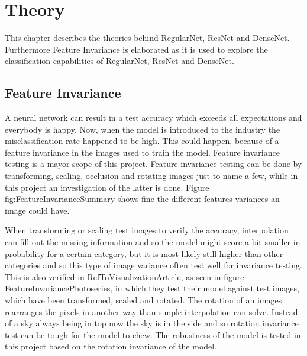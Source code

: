 \chapter{Theory}
\label{chp:theory}

This chapter describes the theories behind RegularNet, ResNet and DenseNet. Furthermore Feature Invariance is elaborated as it is used to explore the classification capabilities of RegularNet, ResNet and DenseNet.

\section{Feature Invariance}
A neural network can result in a test accuracy which exceeds all expectations and everybody is happy. Now, when the model is introduced to the industry the misclassification rate happened to be high. This could happen, because of a feature invariance in the images used to train the model. Feature invariance testing is a mayor scope of this project. Feature invariance testing can be done by transforming, scaling, occlusion and rotating images just to name a few, while in this project an investigation of the latter is done. Figure fig:FeatureInvarianceSummary shows fine the different features variances an image could have.

\FloatBarrier

When transforming or scaling test images to verify the accuracy, interpolation can fill out the missing information and so the model might score a bit smaller in probability for a certain category, but it is most likely still higher than other categories and so this type of image variance often test well for invariance testing. This is also verified in RefToVisualizationArticle, as seen in figure FeatureInvariancePhotoseries, in which they test their model against test images, which have been transformed, scaled and rotated. The rotation of an images rearranges the pixels in another way than simple interpolation can solve. Instead of a sky always being in top now the sky is in the side and so rotation invariance test can be tough for the model to chew. The robustness of the model is tested in this project based on the rotation invariance of the model.

\FloatBarrier






